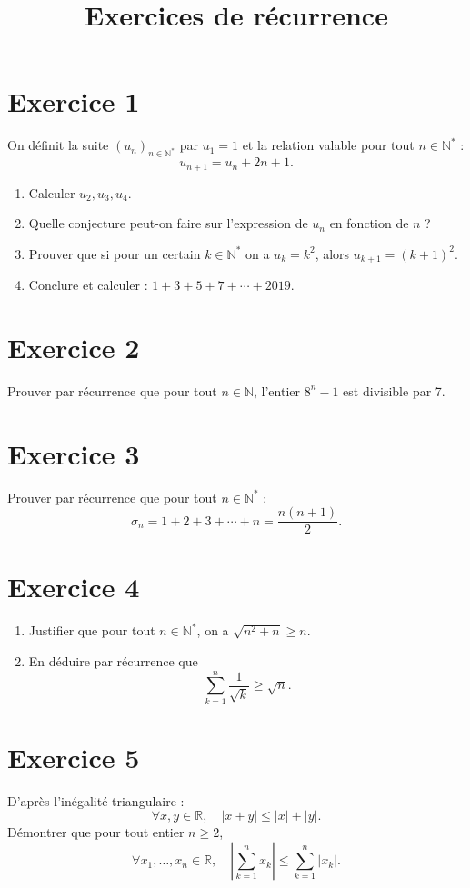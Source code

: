 \documentclass[12pt,a4paper]{article}
\title{Exercices de récurrence}
\author{}
\date{}
\begin{document}
\maketitle

\section*{Exercice 1}
On définit la suite $(u_n)_{n \in \mathbb{N}^*}$ par $u_1=1$ et la relation valable pour tout $n \in \mathbb{N}^*$ :
\[
u_{n+1} = u_n + 2n + 1.
\]
\begin{enumerate}
\item Calculer $u_2, u_3, u_4$.
\item Quelle conjecture peut-on faire sur l’expression de $u_n$ en fonction de $n$ ?
\item Prouver que si pour un certain $k \in \mathbb{N}^*$ on a $u_k = k^2$, alors $u_{k+1} = (k+1)^2$.
\item Conclure et calculer : $1+3+5+7+\cdots+2019$.
\end{enumerate}

\section*{Exercice 2}
Prouver par récurrence que pour tout $n \in \mathbb{N}$, l’entier $8^n - 1$ est divisible par 7.

\section*{Exercice 3}
Prouver par récurrence que pour tout $n \in \mathbb{N}^*$ :
\[
\sigma_n = 1+2+3+\cdots+n = \frac{n(n+1)}{2}.
\]

\section*{Exercice 4}
\begin{enumerate}
\item Justifier que pour tout $n \in \mathbb{N}^*$, on a $\sqrt{n^2+n} \geq n$.
\item En déduire par récurrence que
\[
\sum_{k=1}^n \frac{1}{\sqrt{k}} \geq \sqrt{n}.
\]
\end{enumerate}

\section*{Exercice 5}
D’après l’inégalité triangulaire :
\[
\forall x,y \in \mathbb{R}, \quad |x+y| \leq |x|+|y|.
\]
Démontrer que pour tout entier $n \geq 2$,
\[
\forall x_1, \dots, x_n \in \mathbb{R}, \quad 
\left| \sum_{k=1}^n x_k \right| \leq \sum_{k=1}^n |x_k|.
\]
\end{document}
